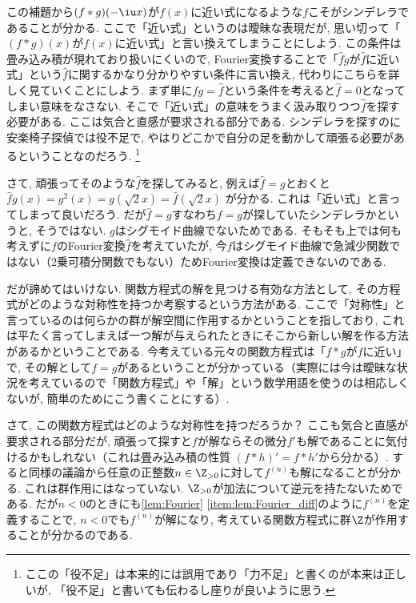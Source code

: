 \documentclass[11pt,b5paper,oneside,lualatex]{ltjsarticle} %
\numberwithin{equation}{section} %
\begin{document}
この補題から$ (f \ast g)(-\iu x) $が$ f(x) $に近い式になるような$ f $こそがシンデレラであることが分かる. 
ここで「近い式」というのは曖昧な表現だが, 思い切って「$ (f \ast g)(x) $が$ f(x) $に近い式」と言い換えてしまうことにしよう. 
この条件は畳み込み積が現れており扱いにくいので, Fourier変換することで「$ \widehat{f} g $が$ \widehat{f} $に近い式」という$ \widehat{f} $に関するかなり分かりやすい条件に言い換え, 代わりにこちらを詳しく見ていくことにしよう. 
まず単に$ \widehat{f} g = \widehat{f} $という条件を考えると$ \widehat{f} = 0 $となってしまい意味をなさない. 
そこで「近い式」の意味をうまく汲み取りつつ$ \widehat{f} $を探す必要がある. 
ここは気合と直感が要求される部分である. 
シンデレラを探すのに安楽椅子探偵では役不足で, やはりどこかで自分の足を動かして頑張る必要があるということなのだろう. 
\footnote{ここの「役不足」は本来的には誤用であり「力不足」と書くのが本来は正しいが, 「役不足」と書いても伝わるし座りが良いように思う. }

さて, 頑張ってそのような$ \widehat{f} $を探してみると, 例えば$ \widehat{f} = g $とおくと
$ \widehat{f} g (x) = g^2 (x) = g(\sqrt{2} x) = \widehat{f} (\sqrt{2} x) $
が分かる. 
これは「近い式」と言ってしまって良いだろう. 
だが$ \widehat{f} = g $すなわち$ f = g $が探していたシンデレラかというと, そうではない. 
$ g $はシグモイド曲線でないためである. 
そもそも上では何も考えずに$ f $のFourier変換$ \widehat{f} $を考えていたが, 今$ f $はシグモイド曲線で急減少関数ではない（$ 2 $乗可積分関数でもない）ためFourier変換は定義できないのである. 

だが諦めてはいけない. 
関数方程式の解を見つける有効な方法として, その方程式がどのような対称性を持つか考察するという方法がある. 
ここで「対称性」と言っているのは何らかの群が解空間に作用するかということを指しており, これは平たく言ってしまえば一つ解が与えられたときにそこから新しい解を作る方法があるかということである. 
今考えている元々の関数方程式は「$ f \ast g $が$ f $に近い」で, その解として$ f = g $があるということが分かっている（実際には今は曖昧な状況を考えているので「関数方程式」や「解」という数学用語を使うのは相応しくないが, 簡単のためにこう書くことにする）. 

さて, この関数方程式はどのような対称性を持つだろうか？
ここも気合と直感が要求される部分だが, 頑張って探すと$ f $が解ならその微分$ f' $も解であることに気付けるかもしれない（これは畳み込み積の性質
$ (f \ast h)' = f \ast h' $から分かる）. 
すると同様の議論から任意の正整数$ n \in \Z_{>0} $に対して$ f^{(n)} $も解になることが分かる. 
これは群作用にはなっていない. $ \Z_{>0} $が加法について逆元を持たないためである. 
だが$ n < 0 $のときにも\cref{lem:Fourier} \cref{item:lem:Fourier_diff}のように$ f^{(n)} $を定義することで, $ n < 0 $でも$ f^{(n)} $が解になり, 考えている関数方程式に群$ \Z $が作用することが分かるのである. 
\end{document}
